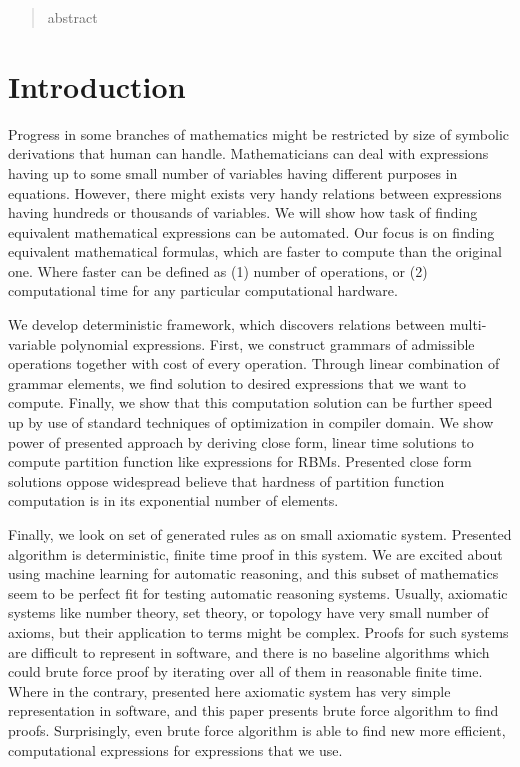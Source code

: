 \documentclass{article}
\begin{document}
 


\icmladdress{}


\vskip 0.3in


\begin{abstract} 
abstract 
\end{abstract} 


\section{Introduction} \label{introduction} 
Progress in some branches of
mathematics might be restricted by size of symbolic derivations that human can
handle.  Mathematicians can deal with expressions having up to some small
number of variables having different purposes in equations. However, there
might exists very handy relations between expressions having hundreds or
thousands of variables. We will show how task of finding equivalent
mathematical expressions can be automated. Our focus is on finding equivalent
mathematical formulas, which are faster to compute than the original one. Where
faster can be defined as (1) number of operations, or (2) computational time
for any particular computational hardware.


We develop deterministic framework, which discovers relations between
multi-variable polynomial expressions. First, we construct grammars of
admissible operations together with cost of every operation. Through linear
combination of grammar elements, we find solution to desired expressions that
we want to compute. Finally, we show that this computation solution can be
further speed up by use of standard techniques of optimization in compiler
domain. We show power of presented approach by deriving close form, linear time
solutions to compute partition function like expressions for RBMs. Presented
close form solutions oppose widespread believe that hardness of partition
function computation is in its exponential number of elements.


Finally, we look on set of generated rules as on small axiomatic system.
Presented algorithm is deterministic, finite time proof in this system.
We are excited about using machine learning for automatic reasoning, and
this subset of mathematics seem to be perfect fit for testing automatic reasoning systems.
Usually, axiomatic systems like number theory, set theory, or topology have very small
number of axioms, but their application to terms might be complex. Proofs
for such systems are difficult to represent in software, and there is no
baseline algorithms which could brute force proof by iterating over all of them in reasonable finite time.
Where in the contrary, presented here axiomatic system has very simple representation
in software, and this paper presents brute force algorithm to find proofs. 
Surprisingly, even brute force algorithm is able to find new more efficient,
computational expressions for expressions that we use.
\end{document}
